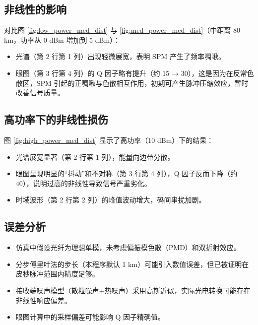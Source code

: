 \documentclass{../ElectromagneticFieldTemplate}
\begin{document}
\subsection{非线性的影响}
对比图 \ref{fig:low_power_med_dist} 与 \ref{fig:med_power_med_dist}（中距离 80 km，功率从 0 dBm 增加到 5 dBm）：
\begin{itemize}
    \item 光谱（第 2 行第 1 列）出现轻微展宽，表明 SPM 产生了频率啁啾。
    \item 眼图（第 3 行第 4 列）的 Q 因子略有提升（约 15 → 30），这是因为在反常色散区，SPM 引起的正啁啾与色散相互作用，初期可产生脉冲压缩效应，暂时改善信号质量。
\end{itemize}

\subsection{高功率下的非线性损伤}
图 \ref{fig:high_power_med_dist} 显示了高功率（10 dBm）下的结果：
\begin{itemize}
    \item 光谱展宽显著（第 2 行第 1 列），能量向边带分散。
    \item 眼图呈现明显的“抖动”和不对称（第 3 行第 4 列），Q 因子反而下降（约 40），说明过高的非线性导致信号严重劣化。
    \item 时域波形（第 2 行第 2 列）的峰值波动增大，码间串扰加剧。
\end{itemize}

\subsection{误差分析}
\begin{itemize}
    \item 仿真中假设光纤为理想单模，未考虑偏振模色散（PMD）和双折射效应。
    \item 分步傅里叶法的步长（本程序默认 1 km）可能引入数值误差，但已被证明在皮秒脉冲范围内精度足够。
    \item 接收端噪声模型（散粒噪声+热噪声）采用高斯近似，实际光电转换可能存在非线性响应偏差。
    \item 眼图计算中的采样偏差可能影响 Q 因子精确值。
\end{itemize}
\end{document}

